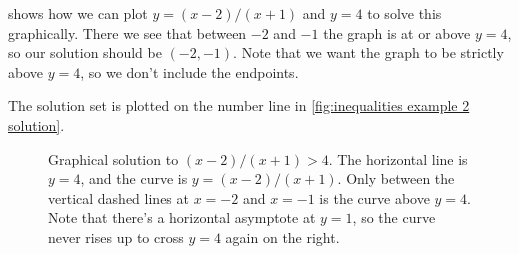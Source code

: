 \documentclass[fleqn]{LectureClass/LectureClass}
\begin{document}
\begin{exm}{}{}
         shows how we can plot \(y = (x - 2)/(x + 1)\) and \(y = 4\) to solve this graphically.
        There we see that between \(-2\) and \(-1\) the graph is at or above \(y = 4\), so our solution should be \((-2, -1)\).
        Note that we want the graph to be strictly above \(y = 4\), so we don't include the endpoints.
        
        The solution set is plotted on the number line in \cref{fig:inequalities example 2 solution}.
    \end{exm}
    
    \begin{figure}
        \centering
        \caption[Graphical solution to \((x - 2)/(x + 1) > 4\).]{Graphical solution to \((x - 2)/(x + 1) > 4\). The horizontal line is \(y = 4\), and the curve is \(y = (x - 2)/(x + 1)\). Only between the vertical dashed lines at \(x = -2\) and \(x = -1\) is the curve above \(y = 4\). Note that there's a horizontal asymptote at \(y = 1\), so the curve never rises up to cross \(y = 4\) again on the right.}
        \label{fig:inequalities example 2}
    \end{figure}
    
\end{document}
